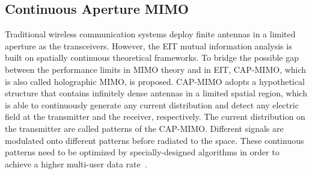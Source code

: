 \documentclass[journal,twocolumn]{IEEEtran}
\begin{document}
\subsection{Continuous Aperture MIMO}
Traditional wireless communication systems deploy finite antennas in a limited aperture as the transceivers. 
However, the EIT mutual information analysis is built on spatially continuous theoretical frameworks. 
To bridge the possible gap between the performance limits in MIMO theory and in EIT, CAP-MIMO, which is also called holographic MIMO, is proposed. 
CAP-MIMO adopts a hypothetical structure that contains infinitely dense antennas in a limited spatial region, which is able to continuously generate any current distribution and detect any electric field at the transmitter and the receiver, respectively.  
The current distribution on the transmitter are called patterns of the CAP-MIMO. 
Different signals are modulated onto different patterns before radiated to the space. 
These continuous patterns need to be optimized by specially-designed algorithms in order to achieve a higher multi-user data rate~\cite{zhang2022pdma}. 


\end{document}
